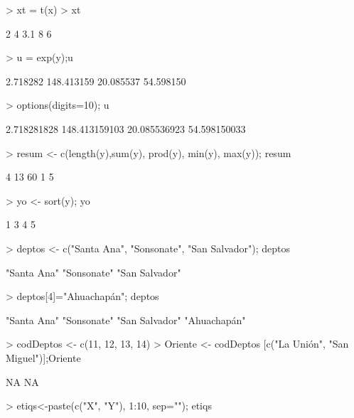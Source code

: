 \documentclass{article}
\begin{document}
\begin{Schunk}
\begin{Sinput}
> xt = t(x)
> xt
\end{Sinput}
\begin{Soutput}
     [,1] [,2] [,3] [,4] [,5]
[1,]    2    4  3.1    8    6
\end{Soutput}
\begin{Sinput}
> u = exp(y);u
\end{Sinput}
\begin{Soutput}
[1]   2.718282 148.413159  20.085537  54.598150
\end{Soutput}
\begin{Sinput}
> options(digits=10); u
\end{Sinput}
\begin{Soutput}
[1]   2.718281828 148.413159103  20.085536923  54.598150033
\end{Soutput}
\begin{Sinput}
> resum <- c(length(y),sum(y), prod(y), min(y), max(y)); resum
\end{Sinput}
\begin{Soutput}
[1]  4 13 60  1  5
\end{Soutput}
\begin{Sinput}
> yo <- sort(y); yo
\end{Sinput}
\begin{Soutput}
[1] 1 3 4 5
\end{Soutput}
\begin{Sinput}
> deptos <- c("Santa Ana", "Sonsonate", "San Salvador"); deptos
\end{Sinput}
\begin{Soutput}
[1] "Santa Ana"    "Sonsonate"    "San Salvador"
\end{Soutput}
\begin{Sinput}
> deptos[4]="Ahuachapán"; deptos
\end{Sinput}
\begin{Soutput}
[1] "Santa Ana"    "Sonsonate"    "San Salvador" "Ahuachapán"  
\end{Soutput}
\begin{Sinput}
> codDeptos <- c(11, 12, 13, 14)
> Oriente <- codDeptos [c("La Unión", "San Miguel")];Oriente
\end{Sinput}
\begin{Soutput}
[1] NA NA
\end{Soutput}
\begin{Sinput}
> etiqs<-paste(c("X", "Y"), 1:10, sep=""); etiqs
\end{Sinput}
\begin{Soutput}

\end{Soutput}
\end{Schunk}
\end{document}

